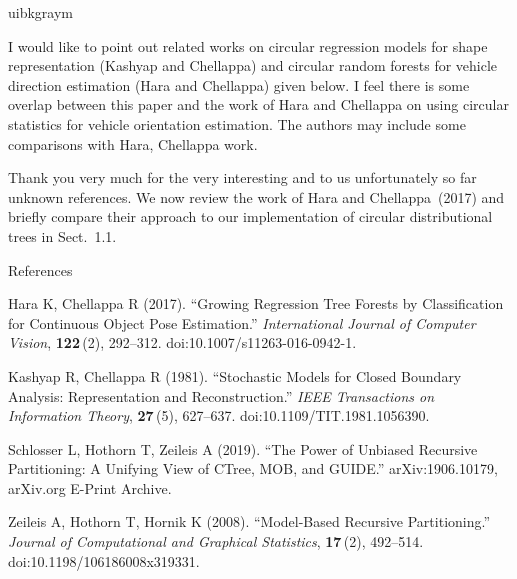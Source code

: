 \documentclass[english, noconfig]{uibklttr}
\newenvironment{re}{
    \begin{color}{uibkgraym}
        \itshape
}{
    \end{color}
}
\begin{document}
\vspace{0.5em}
\begin{re}
I would like to point out related works on circular regression models for
shape representation (Kashyap and Chellappa) and circular random forests for
vehicle direction estimation (Hara and Chellappa) given below. I feel there is
some overlap between this paper and the work of Hara and Chellappa on using
circular statistics for vehicle orientation estimation. The authors may include
some comparisons with Hara, Chellappa work.
\end{re}

Thank you very much for the very interesting and to us unfortunately so far unknown references.
We now review the work of Hara and Chellappa~(2017) and briefly compare their approach
to our implementation of circular distributional trees in Sect.~1.1.

\vspace{0.5cm}
References

Hara K, Chellappa R (2017). ``Growing Regression Tree Forests by
Classification for Continuous Object Pose Estimation.'' \emph{International
Journal of Computer Vision}, \textbf{122}\,(2), 292--312.
doi:10.1007/s11263-016-0942-1.

Kashyap R, Chellappa R (1981). ``Stochastic Models for Closed Boundary
Analysis: Representation and Reconstruction.'' \emph{IEEE Transactions on
Information Theory}, \textbf{27}\,(5), 627--637. doi:10.1109/TIT.1981.1056390.

Schlosser L, Hothorn T, Zeileis A (2019). ``The Power of Unbiased Recursive
Partitioning: A Unifying View of CTree, MOB, and GUIDE.'' arXiv:1906.10179,
arXiv.org E-Print Archive.

Zeileis A, Hothorn T, Hornik K (2008). ``Model-Based Recursive Partitioning.''
\emph{Journal of Computational and Graphical Statistics}, \textbf{17}\,(2),
492--514. doi:10.1198/106186008x319331.
\end{document}
